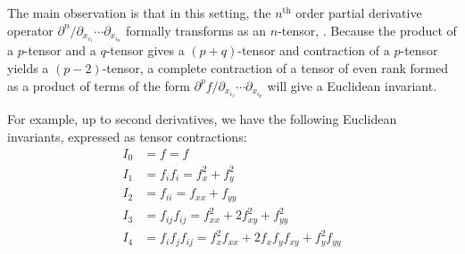\documentclass[review,onefignum,onetabnum]{siamonline190516}
\begin{document}
The main observation is that in this setting, the $n^\text{th}$ order
partial derivative operator $\partial^n / \partial_{x_{i_1}}\cdots
\partial_{x_{i_n}}$ formally transforms as an $n$-tensor, \citep{Florack1993}. Because the product of a $p$-tensor and a $q$-tensor gives a $(p+q)$-tensor and contraction of a $p$-tensor yields a $(p-2)$-tensor, a complete contraction of a tensor of even rank formed as a product of terms of the form $\partial^p f / \partial_{x_{i_1}} \cdots \partial_{x_{i_p}}$ will give a Euclidean invariant.

For example, up to second derivatives, we have the following Euclidean invariants, expressed as tensor contractions:
\begin{equation}
\label{eq:e2tensor}
\begin{aligned}
  I_0 &= f = f \\
  I_1 &= f_if_i = f_x^2 + f_y^2 \\
  I_2 &= f_{ii} = f_{xx} + f_{yy} \\
  I_3 &= f_{ij} f_{ij} = f_{xx}^2 + 2f_{xy}^2 + f_{yy}^2 \\
  I_4 &= f_i f_j f_{ij} = f_x^2 f_{xx} + 2f_x f_y f_{xy} + f_y^2 f_{yy}
\end{aligned}
\end{equation}
\end{document}
